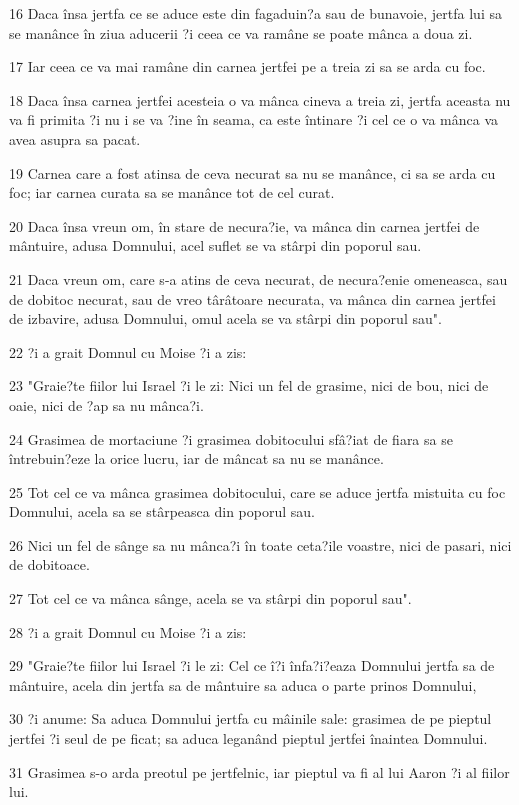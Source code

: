 \par 16 Daca însa jertfa ce se aduce este din fagaduin?a sau de bunavoie, jertfa lui sa se manânce în ziua aducerii ?i ceea ce va ramâne se poate mânca a doua zi.
\par 17 Iar ceea ce va mai ramâne din carnea jertfei pe a treia zi sa se arda cu foc.
\par 18 Daca însa carnea jertfei acesteia o va mânca cineva a treia zi, jertfa aceasta nu va fi primita ?i nu i se va ?ine în seama, ca este întinare ?i cel ce o va mânca va avea asupra sa pacat.
\par 19 Carnea care a fost atinsa de ceva necurat sa nu se manânce, ci sa se arda cu foc; iar carnea curata sa se manânce tot de cel curat.
\par 20 Daca însa vreun om, în stare de necura?ie, va mânca din carnea jertfei de mântuire, adusa Domnului, acel suflet se va stârpi din poporul sau.
\par 21 Daca vreun om, care s-a atins de ceva necurat, de necura?enie omeneasca, sau de dobitoc necurat, sau de vreo târâtoare necurata, va mânca din carnea jertfei de izbavire, adusa Domnului, omul acela se va stârpi din poporul sau".
\par 22 ?i a grait Domnul cu Moise ?i a zis:
\par 23 "Graie?te fiilor lui Israel ?i le zi: Nici un fel de grasime, nici de bou, nici de oaie, nici de ?ap sa nu mânca?i.
\par 24 Grasimea de mortaciune ?i grasimea dobitocului sfâ?iat de fiara sa se întrebuin?eze la orice lucru, iar de mâncat sa nu se manânce.
\par 25 Tot cel ce va mânca grasimea dobitocului, care se aduce jertfa mistuita cu foc Domnului, acela sa se stârpeasca din poporul sau.
\par 26 Nici un fel de sânge sa nu mânca?i în toate ceta?ile voastre, nici de pasari, nici de dobitoace.
\par 27 Tot cel ce va mânca sânge, acela se va stârpi din poporul sau".
\par 28 ?i a grait Domnul cu Moise ?i a zis:
\par 29 "Graie?te fiilor lui Israel ?i le zi: Cel ce î?i înfa?i?eaza Domnului jertfa sa de mântuire, acela din jertfa sa de mântuire sa aduca o parte prinos Domnului,
\par 30 ?i anume: Sa aduca Domnului jertfa cu mâinile sale: grasimea de pe pieptul jertfei ?i seul de pe ficat; sa aduca leganând pieptul jertfei înaintea Domnului.
\par 31 Grasimea s-o arda preotul pe jertfelnic, iar pieptul va fi al lui Aaron ?i al fiilor lui.
